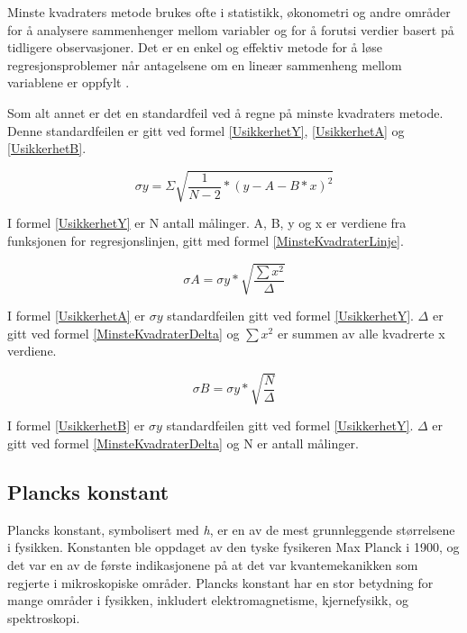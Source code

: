 \documentclass[twocolumn, 11pt]{article} %
\begin{document}
Minste kvadraters metode brukes ofte i statistikk, økonometri og andre områder for å analysere sammenhenger mellom variabler og for å forutsi verdier basert på tidligere observasjoner. Det er en enkel og effektiv metode for å løse regresjonsproblemer når antagelsene om en lineær sammenheng mellom variablene er oppfylt \cite{taylor1997error}. 

Som alt annet er det en standardfeil ved å regne på minste kvadraters metode. Denne standardfeilen er gitt ved formel \eqref{UsikkerhetY}, \eqref{UsikkerhetA} og \eqref{UsikkerhetB}.

\begin{equation}
    \sigma y = \Sigma \sqrt{\frac{1}{N-2}*(y-A-B*x)^2}
    \label{UsikkerhetY}
\end{equation}

I formel \eqref{UsikkerhetY} er N antall målinger. A, B, y og x er verdiene fra funksjonen for regresjonslinjen, gitt med formel \eqref{MinsteKvadraterLinje}.

\begin{equation}
    \sigma A = \sigma y * \sqrt{\frac{\sum x^2}{\Delta}}
    \label{UsikkerhetA}
\end{equation}

I formel \eqref{UsikkerhetA} er $\sigma y$ standardfeilen gitt ved formel \eqref{UsikkerhetY}. $\Delta$ er gitt ved formel \eqref{MinsteKvadraterDelta} og $\sum x^2$ er summen av alle kvadrerte x verdiene.

\begin{equation}
    \sigma B = \sigma y * \sqrt{\frac{N}{\Delta}}
    \label{UsikkerhetB}
\end{equation}

I formel \eqref{UsikkerhetB} er $\sigma y$ standardfeilen gitt ved formel \eqref{UsikkerhetY}. $\Delta$ er gitt ved formel \eqref{MinsteKvadraterDelta} og N er antall målinger.


\subsection{Plancks konstant}
Plancks konstant, symbolisert med \textit{h}, er en av de mest grunnleggende størrelsene i fysikken. Konstanten ble oppdaget av den tyske fysikeren Max Planck i 1900, og det var en av de første indikasjonene på at det var kvantemekanikken som regjerte i mikroskopiske områder. Plancks konstant har en stor betydning for mange områder i fysikken, inkludert elektromagnetisme, kjernefysikk, og spektroskopi.
\end{document}
